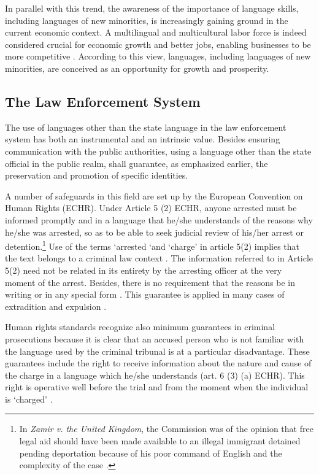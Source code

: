 \documentclass[output=paper,colorlinks,citecolor=brown]{langscibook}
\begin{document}
In parallel with this trend, the awareness of the importance of language skills, including languages of new minorities, is increasingly gaining ground in the current economic context. A multilingual and multicultural labor force is indeed considered crucial for economic growth and better jobs, enabling businesses to be more competitive \citep{huddleston_wolffhardt2016,npld2015,gazzola_wickstrom2016}. According to this view, languages, including languages of new minorities, are conceived as an opportunity for growth and prosperity.

\subsection{The Law Enforcement System}\label{ch2.4.ss.4.3}

The use of languages other than the state language in the law enforcement system has both an instrumental and an intrinsic value. Besides ensuring communication with the public authorities, using a language other than the state official in the public realm, shall guarantee, as emphasized earlier, the preservation and promotion of specific identities.

A number of safeguards in this field are set up by the European Convention on Human Rights (ECHR). Under Article 5 (2) ECHR, anyone arrested must be informed promptly and in a language that he/she understands of the reasons why he/she was arrested, so as to be able to seek judicial review of his/her arrest or detention.\footnote{In \textit{Zamir v. the United Kingdom}, the Commission was of the opinion that free legal aid should have been made available to an illegal immigrant detained pending deportation because of his poor command of English and the complexity of the case \citep{ECommHRa1983}.} Use of the terms `arrested `and `charge' in article 5(2) implies that the text belongs to a criminal law context \citep{schabas2015}. The information referred to in Article 5(2) need not be related in its entirety by the arresting officer at the very moment of the arrest. Besides, there is no requirement that the reasons be in writing or in any special form \citep{schabas2015}. This guarantee is applied in many cases of extradition and expulsion \citep{schabas2015}.

Human rights standards recognize also minimum guarantees in criminal prosecutions because it is clear that an accused person who is not familiar with the language used by the criminal tribunal is at a particular disadvantage. These guarantees include the right to receive information about the nature and cause of the charge in a language which he/she understands (art. 6 (3) (a) ECHR). This right is operative well before the trial and from the moment when the individual is `charged' \citep{schabas2015,ovey_white2006}.
\end{document}
